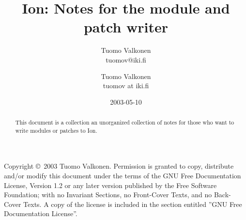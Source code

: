 \documentclass[english,a4paper,11pt,oldtoc,mctitle]{artikel3}
\title{Ion: Notes for the module and patch writer}
\author{Tuomo Valkonen \\ tuomov@iki.fi}
\author{Tuomo Valkonen \\ tuomov at iki.fi}
\date{2003-05-10}
\begin{document}
\maketitle

Copyright \copyright\  2003 Tuomo Valkonen.
Permission is granted to copy, distribute and/or modify this document
under the terms of the GNU Free Documentation License, Version 1.2
or any later version published by the Free Software Foundation;
with no Invariant Sections, no Front-Cover Texts, and no Back-Cover Texts.
A copy of the license is included in the section entitled ''GNU
Free Documentation License''.

\bigskip

\begin{abstract}
    This document is a collection an unorganized collection of notes for
    those who want to write modules or patches to Ion.
\end{abstract}

\tableofcontents







\appendix



\printindex
\end{document}

